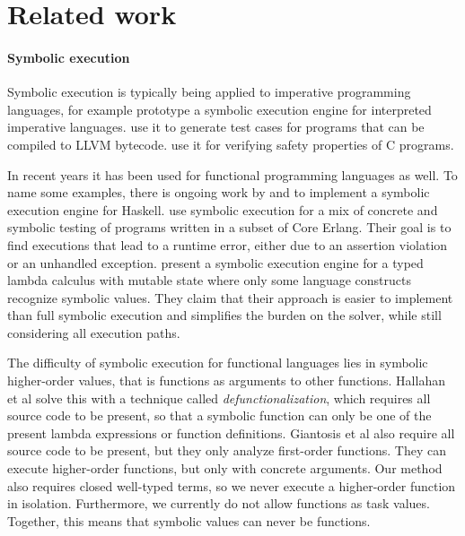 


\section{Related work}
\label{sec:relatedwork}

\paragraph{Symbolic execution}
Symbolic execution \cite{King1975,Boyer1975} is typically being applied to imperative programming languages, for example \citet{BucurKC2014} prototype a symbolic execution engine for interpreted imperative languages.
\citet{CadarDE2008} use it to generate test cases for programs that can be compiled to LLVM bytecode.
\citet{JaffarMNS2012} use it for verifying safety properties of C programs.

In recent years it has been used for functional programming languages as well.
To name some examples, there is ongoing work by \citet{HallahanXP2017} and \citet{Xue2019} to implement a symbolic execution engine for Haskell.
\citet{GiantsiosPS2017} use symbolic execution for a mix of concrete and symbolic testing of programs written in a subset of Core Erlang.
Their goal is to find executions that lead to a runtime error, either due to an assertion violation or an unhandled exception.
\citet{ChangKT2018} present a symbolic execution engine for a typed lambda calculus with mutable state where only some language constructs recognize symbolic values.
They claim that their approach is easier to implement than full symbolic execution and simplifies the burden on the solver, while still considering all execution paths.

The difficulty of symbolic execution for functional languages lies in symbolic higher-order values, that is functions as arguments to other functions.
Hallahan et al solve this with a technique called \emph{defunctionalization}, which requires all source code to be present, so that a symbolic function can only be one of the present lambda expressions or function definitions.
Giantosis et al also require all source code to be present, but they only analyze first-order functions.
They can execute higher-order functions, but only with concrete arguments.
Our method also requires closed well-typed terms, so we never execute a higher-order function in isolation.
Furthermore, we currently do not allow functions as task values.
Together, this means that symbolic values can never be functions.




